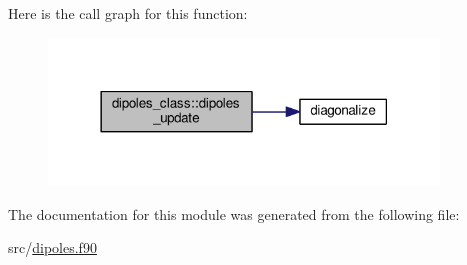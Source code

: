 Here is the call graph for this function\+:\nopagebreak
\begin{figure}[H]
\begin{center}
\leavevmode
\includegraphics[width=294pt]{classdipoles__class_a9157bf14add87f3f26edfbc88c0da6fe_cgraph}
\end{center}
\end{figure}




The documentation for this module was generated from the following file\+:\begin{DoxyCompactItemize}
\item 
src/\hyperlink{dipoles_8f90}{dipoles.\+f90}\end{DoxyCompactItemize}
